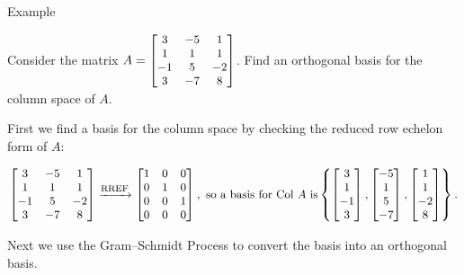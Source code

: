 \documentclass[xcolor=dvipsnames,aspectratio=169,t]{beamer}
\begin{document}
\begin{frame}{Example}
  \smallskip
  
  Consider the matrix $A = \small \begin{bmatrix} 3 & -5 & 1 \\ 1 & 1 & 1 \\ -1 & 5 & -2 \\ 3 & -7 & 8 \end{bmatrix}$.
  Find an \alert{orthogonal basis} for the column space of $A$.
  \bigskip

  \pause
  First we find a basis for the column space by checking the reduced row echelon form of $A$:

  \[ \small \begin{bmatrix} 3 & -5 & 1 \\ 1 & 1 & 1 \\ -1 & 5 & -2 \\ 3 & -7 & 8 \end{bmatrix} \xrightarrow{\text{RREF}} \begin{bmatrix} 1 & 0 & 0 \\ 0 & 1 & 0\\ 0 & 0 &  1 \\ 0 & 0 & 0 \end{bmatrix}, \mbox{ so a basis for $\mbox{Col } A$ is}
  \left\{ \begin{bmatrix} 3\\ 1 \\ -1 \\ 3 \end{bmatrix} , \begin{bmatrix} -5 \\ 1 \\ 5 \\ -7 \end{bmatrix}, \begin{bmatrix} 1 \\ 1 \\ -2 \\ 8 \end{bmatrix} \right\}. \]
  \vspace*{2em}

  Next we use the Gram--Schmidt Process to convert the basis into an \alert{orthogonal} basis.
\end{frame}
\end{document}
